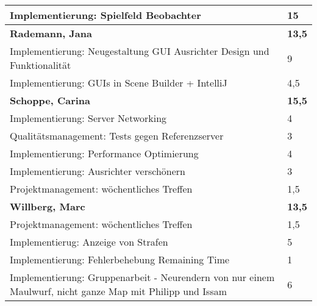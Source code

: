 \documentclass[a4paper,11pt]{scrartcl}
\begin{document}
\begin{longtable}{| p{13.8cm} | C{2.4cm} |}
  Implementierung: Spielfeld Beobachter
	&
  15
	\\
	\hline
	\hline


	\textbf{Rademann, Jana} & \textbf{13,5}\\ %
	\hline

  Implementierung: Neugestaltung GUI Ausrichter Design und Funktionalität
	&
  9
	\\
	\hline

  Implementierung: GUIs in Scene Builder + IntelliJ
	&
  4,5
	\\
	\hline
	\hline


	\textbf{Schoppe, Carina} & \textbf{15,5}\\ %
	\hline

  Implementierung: Server Networking
	&
  4
	\\
	\hline

  Qualitätsmanagement: Tests gegen Referenzserver
	&
  3
	\\
	\hline

  Implementierung: Performance Optimierung
	&
  4
	\\
	\hline

  Implementierung: Ausrichter verschönern
	&
  3
	\\
	\hline

  Projektmanagement: wöchentliches Treffen
	&
  1,5
	\\
	\hline
	\hline


	\textbf{Willberg, Marc} & \textbf{13,5}\\ %
	\hline

  Projektmanagement: wöchentliches Treffen
	&
  1,5
	\\
	\hline

  Implementierug: Anzeige von Strafen
	&
  5
	\\
	\hline

  Implementierung: Fehlerbehebung Remaining Time
	&
  1
	\\
	\hline

  Implementierung: Gruppenarbeit - Neurendern von nur einem Maulwurf, nicht ganze Map mit Philipp und Issam
	&
  6
	\\
	\hline

\end{longtable}
\end{document}
